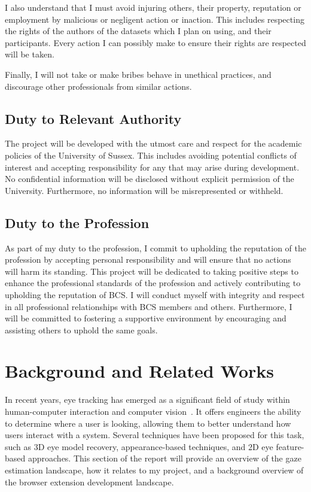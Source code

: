 \documentclass{report}
\begin{document}
I also understand that I must avoid injuring others, their property, reputation or employment by malicious or negligent action or inaction. This includes respecting the rights of the authors of the datasets which I plan on using, and their participants. Every action I can possibly make to ensure their rights are respected will be taken. 

Finally, I will not take or make bribes behave in unethical practices, and discourage other professionals from similar actions.  

\section{Duty to Relevant Authority}   

The project will be developed with the utmost care and respect for the academic policies of the University of Sussex. This includes avoiding potential conflicts of interest and accepting responsibility for any that may arise during development. No confidential information will be disclosed without explicit permission of the University. Furthermore, no information will be misrepresented or withheld. 

\section{Duty to the Profession}   

As part of my duty to the profession, I commit to upholding the reputation of the profession by accepting personal responsibility and will ensure that no actions will harm its standing. This project will be dedicated to taking positive steps to enhance the professional standards of the profession and actively contributing to upholding the reputation of BCS. I will conduct myself with integrity and respect in all professional relationships with BCS members and others. Furthermore, I will be committed to fostering a supportive environment by encouraging and assisting others to uphold the same goals. 

\chapter{Background and Related Works}
\label{chap:background}
\noindent
In recent years, eye tracking has emerged as a significant field of study within human-computer interaction and computer vision~\cite{cheng2021survey,kar2017review}. It offers engineers the ability to determine where a user is looking, allowing them to better understand how users interact with a system. Several techniques have been proposed for this task, such as 3D eye model recovery, appearance-based techniques, and 2D eye feature-based approaches. This section of the report will provide an overview of the gaze estimation landscape, how it relates to my project, and a background overview of the browser extension development landscape. 
\end{document}
